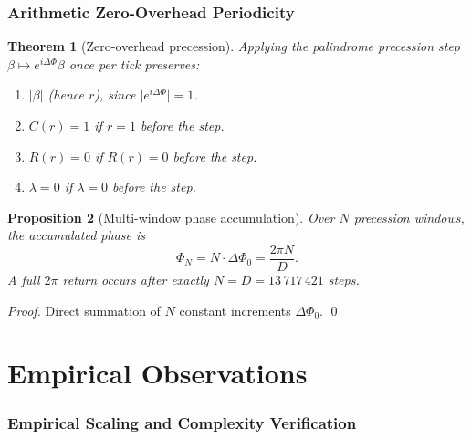 \documentclass[12pt,a4paper]{article}
\theoremstyle{plain}
\newtheorem{theorem}{Theorem}[section]
\newtheorem{proposition}[theorem]{Proposition}
\theoremstyle{definition}
\theoremstyle{remark}
\newcommand{\abs}[1]{\lvert #1 \rvert}
\begin{document}
\section{Arithmetic Zero-Overhead Periodicity}
\label{sec:arith}

\begin{theorem}[Zero-overhead precession]\label{thm:zero-overhead-prec}
  Applying the palindrome precession step $\beta \mapsto e^{i\Delta\Phi}\beta$
  once per tick preserves:
  \begin{enumerate}
    \item $\abs{\beta}$ (hence $r$), since $\abs{e^{i\Delta\Phi}}=1$.
    \item $C(r)=1$ if $r=1$ before the step.
    \item $R(r)=0$ if $R(r)=0$ before the step.
    \item $\lambda = 0$ if $\lambda = 0$ before the step.
  \end{enumerate}
\end{theorem}

\begin{proposition}[Multi-window phase accumulation]\label{prop:phase-accum}
  Over $N$ precession windows, the accumulated phase is
  \begin{equation}
    \Phi_N = N\cdot\Delta\Phi_0 = \frac{2\pi N}{D}.
    \label{eq:phase-accum}
  \end{equation}
  A full $2\pi$ return occurs after exactly $N = D = 13\,717\,421$ steps.
\end{proposition}

\begin{proof}
  Direct summation of $N$ constant increments $\Delta\Phi_0$. \qed
\end{proof}

\part{Empirical Observations}
\label{part:empirical}

\section{Empirical Scaling and Complexity Verification}
\label{sec:empirical}
\end{document}
